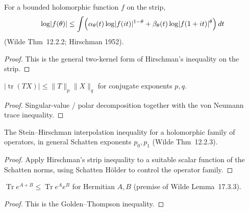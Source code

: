 \begin{theorem}
  \label{thm:hirschman_strip}
  For a bounded holomorphic function $f$ on the strip,
  \[
    \log\lvert f(\theta)\rvert
      \le \int \Bigl(
        \alpha_\theta(t)\log\lvert f(it)\rvert^{1-\theta}
        + \beta_\theta(t)\log\lvert f(1+it)\rvert^{\theta}
      \Bigr)\,dt
  \]
  (Wilde Thm~12.2.2; Hirschman 1952).
\end{theorem}

\begin{proof}
  This is the general two-kernel form of Hirschman's inequality on the strip.
\end{proof}

\begin{theorem}
  \label{thm:schatten_holder}
  $\lvert\operatorname{tr}(TX)\rvert \le \lVert T\rVert_p\lVert X\rVert_q$ for
  conjugate exponents $p,q$.
\end{theorem}

\begin{proof}
  Singular-value / polar decomposition together with the von Neumann trace
  inequality.
\end{proof}

\begin{theorem}
  \label{thm:stein_hirschman}
  The Stein--Hirschman interpolation inequality for a holomorphic family of
  operators, in general Schatten exponents $p_0,p_1$ (Wilde Thm~12.2.3).
\end{theorem}

\begin{proof}
  Apply Hirschman's strip inequality to a suitable scalar function of the
  Schatten norms, using Schatten H\"older to control the operator family.
\end{proof}

\begin{theorem}
  \label{thm:golden_thompson}
  $\operatorname{Tr} e^{A+B} \le \operatorname{Tr} e^A e^B$ for Hermitian
  $A,B$ (premise of Wilde Lemma~17.3.3).
\end{theorem}

\begin{proof}
  This is the Golden--Thompson inequality.
\end{proof}

